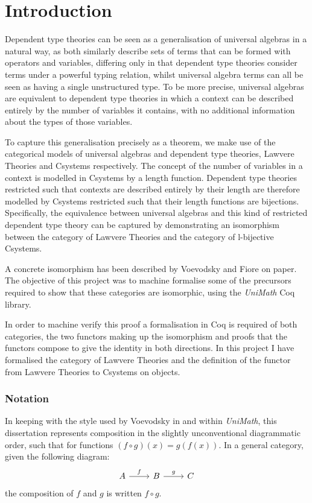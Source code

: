 \chapter{Introduction}
Dependent type theories\cite{itt}\cite{dtt} can be seen as a generalisation of
universal algebras
\!\cite{universalalgebra}\cite{univalg2}\cite{univalg3}\cite{univalg4} in a
natural way, as both similarly describe sets of terms that can be formed with
operators and variables, differing only in that dependent type theories consider
terms under a powerful typing relation, whilst universal algebra terms can all
be seen as having a single unstructured type. To be more precise, universal
algebras are equivalent to dependent type theories in which a context can be
described entirely by the number of variables it contains, with no additional
information about the types of those variables.

To capture this generalisation precisely as a theorem, we make use of the
categorical models of universal algebras and dependent type theories, Lawvere
Theories and Csystems respectively. The concept of the number of variables in a
context is modelled in Csystems by a length function. Dependent type theories
restricted such that contexts are described entirely by their length are
therefore modelled by Csystems restricted such that their length functions are
bijections. Specifically, the equivalence between universal algebras and this
kind of restricted dependent type theory can be captured by demonstrating an
isomorphism between the category of Lawvere Theories and the category of
l-bijective Csystems.

A concrete isomorphism has been described by Voevodsky and Fiore on
paper\cite{VoevodskyFiore}. The objective of this project was to machine
formalise some of the precursors required to show that these categories are
isomorphic, using the \textit{UniMath} Coq library\cite{coq}. 

In order to machine verify this proof a formalisation in Coq is required of
both categories, the two functors making up the isomorphism and proofs that the
functors compose to give the identity in both directions. In this project I have
formalised the category of Lawvere Theories and the definition of the functor
from Lawvere Theories to Csystems on objects.

\subsection*{Notation}
In keeping with the style used by Voevodsky
in\cite{VoevodskyFiore}\cite{voevodskycsystems} and within \textit{UniMath},
this dissertation represents composition in the slightly unconventional
diagrammatic order, such that for functions $(f\circ g)(x) = g(f(x))$. In a
general category, given the following diagram:
\[
\begin{tikzcd}
    A\ar[r,"f"]&B\ar[r,"g"]&C
\end{tikzcd}
\]
the composition of $f$ and $g$ is written $f\circ g$.